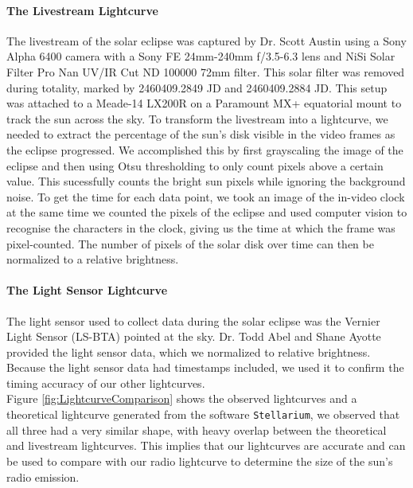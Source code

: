 \paragraph{The Livestream Lightcurve}
The livestream of the solar eclipse was captured by Dr. Scott Austin using a Sony Alpha 6400 camera with a Sony FE 24mm-240mm f/3.5-6.3 lens and NiSi Solar Filter Pro Nan UV/IR Cut ND 100000 72mm filter.
This solar filter was removed during totality, marked by 2460409.2849 JD and 2460409.2884 JD.
This setup was attached to a Meade-14 LX200R on a Paramount MX+ equatorial mount to track the sun across the sky.
To transform the livestream into a lightcurve, we needed to extract the percentage of the sun's disk visible in the video frames as the eclipse progressed.
We accomplished this by first grayscaling the image of the eclipse and then using Otsu thresholding to only count pixels above a certain value.
This sucessfully counts the bright sun pixels while ignoring the background noise.
To get the time for each data point, we took an image of the in-video clock at the same time we counted the pixels of the eclipse and used computer vision to recognise the characters in the clock, giving us the time at which the frame was pixel-counted.
The number of pixels of the solar disk over time can then be normalized to a relative brightness.
\paragraph{The Light Sensor Lightcurve}
The light sensor used to collect data during the solar eclipse was the Vernier Light Sensor (LS-BTA) pointed at the sky.
Dr. Todd Abel and Shane Ayotte provided the light sensor data, which we normalized to relative brightness.
Because the light sensor data had timestamps included, we used it to confirm the timing accuracy of our other lightcurves.
\\
Figure \ref{fig:LightcurveComparison} shows the observed lightcurves and a theoretical lightcurve generated from the software \texttt{Stellarium}\cite{zotti_simulated_2020}, we observed that all three had a very similar shape, with heavy overlap between the theoretical and livestream lightcurves.
This implies that our lightcurves are accurate and can be used to compare with our radio lightcurve to determine the size of the sun's radio emission.

